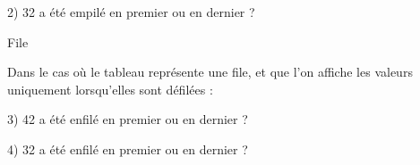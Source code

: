\documentclass[11pt,a4paper]{article}
\begin{document}
\begin{center}
\begin{table}[ht!]
\begin{minipage}{0.45\textwidth}
\bigskip
\bigskip
\bigskip

2) 32 a été empilé en premier ou en dernier ?

\bigskip
\bigskip
\bigskip

  \end{minipage}
  \hfillx
  \begin{minipage}{0.01\textwidth}


  \end{minipage}
  \hfillx
  \begin{minipage}{0.45\textwidth}
    \centering
File

Dans le cas où le tableau représente une file, et que l'on affiche les valeurs uniquement lorsqu'elles sont défilées :

\smallskip

\raggedright
3) 42 a été enfilé en premier ou en dernier ?

\bigskip
\bigskip
\bigskip

4) 32 a été enfilé en premier ou en dernier ?

\bigskip
\bigskip
\bigskip

  \end{minipage}
\end{table}

\end{center}

\vspace*{-1.5cm}
\end{document}

